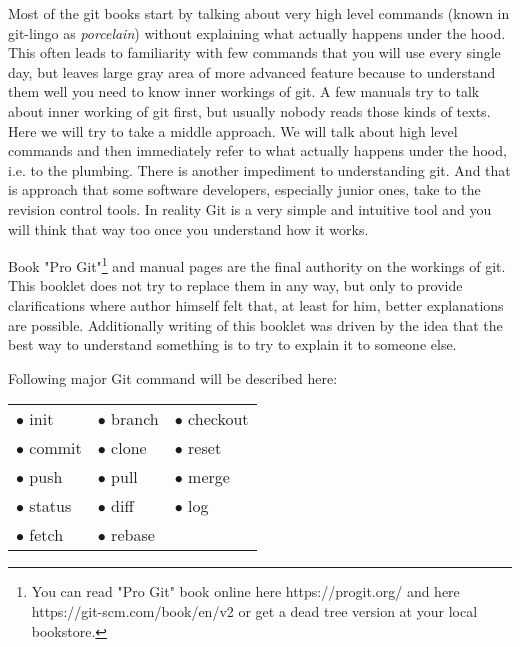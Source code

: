 \documentclass{article}
\theoremstyle{definition}
\begin{document}
        Most of the git books start by talking about very high level commands (known in git-lingo as {\em porcelain})
        without explaining what actually happens under the hood. This often leads to familiarity with few commands that you
        will use every single day, but leaves large gray area of more advanced feature because to understand them well you
        need to know inner workings of git. A few manuals try to talk about inner working of git first, but usually nobody
        reads those kinds of texts. Here we will try to take a middle approach. We will talk about high level commands and
        then immediately refer to what actually happens under the hood, i.e. to the plumbing. There is another impediment to
        understanding git. And that is approach that some software developers, especially junior ones, take to the revision
        control tools. In reality Git is a very simple and intuitive tool and you will think that way too once you
        understand how it works.

        Book "Pro Git"\footnote{You can read "Pro Git" book online here https://progit.org/ and here
        https://git-scm.com/book/en/v2 or get a dead tree version at your local bookstore.} and manual pages are the final
        authority on the workings of git. This booklet does not try to replace them in any way, but only to provide
        clarifications where author himself felt that, at least for him, better explanations are possible. Additionally
        writing of this booklet was driven by the idea that the best way to understand something is to try to explain it to
        someone else.

        Following major Git command will be described here:

        \begin{center}
        \begin{tabular}{ l l l }
        $\bullet$ init & $\bullet$ branch & $\bullet$ checkout \\
        $\bullet$ commit & $\bullet$ clone & $\bullet$ reset \\
        $\bullet$ push & $\bullet$ pull & $\bullet$ merge \\
        $\bullet$ status & $\bullet$ diff & $\bullet$ log \\
        $\bullet$ fetch & $\bullet$ rebase
        \end{tabular}
        \end{center}

        \newpage
\end{document}
